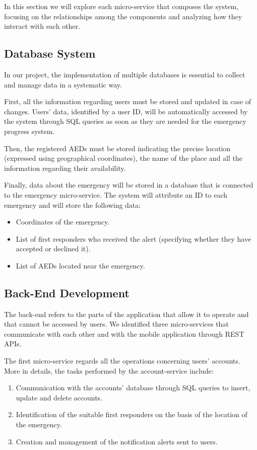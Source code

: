 \documentclass[11pt,a4paper]{article}
\begin{document}
In this section we will explore each micro-service that composes the system, focusing on the relationships among the components and analyzing how they interact with each other.

\subsection{Database System}
In our project, the implementation of multiple databases is essential to collect and manage data in a systematic way.

First, all the information regarding users must be stored and updated in case of changes. 
%
Users' data, identified by a user ID, will be automatically accessed by the system through SQL queries as soon as they are needed for the emergency progress system. 

Then, the registered AEDs must be stored indicating the precise location (expressed using geographical coordinates), the name of the place and all the information regarding their availability.

Finally, data about the emergency will be stored in a database that is connected to the emergency micro-service.
%
The system will attribute an ID to each emergency and will store the following data:

\begin{itemize}
    \item Coordinates of the emergency.
    \item List of first responders who received the alert (specifying whether they have accepted or declined it).
    \item List of AEDs located near the emergency.
\end{itemize}

\subsection{Back-End Development}
The back-end refers to the parts of the application that allow it to operate and that cannot be accessed by users.
%
We identified three micro-services that communicate with each other and with the mobile application through REST APIs.

The first micro-service regards all the operations concerning users' accounts.
%
More in details, the tasks performed by the account-service include:

\begin{enumerate}
    \item Communication with the accounts' database through SQL queries to insert, update and delete accounts.
    \item Identification of the suitable first responders on the basis of the location of the emergency.
    \item Creation and management of the notification alerts sent to users.
\end{enumerate}
\end{document}
